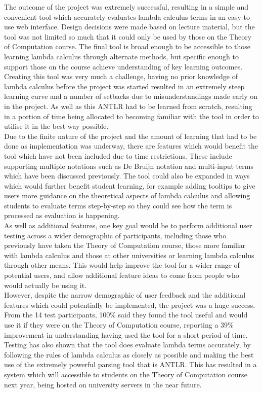 \documentclass[a4paper,11pt]{report}
\begin{document}
The outcome of the project was extremely successful, resulting in a simple and convenient tool which accurately evaluates lambda calculus terms in an easy-to-use web interface. Design decisions were made based on lecture material, but the tool was not limited so much that it could only be used by those on the Theory of Computation course. The final tool is broad enough to be accessible to those learning lambda calculus through alternate methods, but specific enough to support those on the course achieve understanding of key learning outcomes.\\

Creating this tool was very much a challenge, having no prior knowledge of lambda calculus before the project was started resulted in an extremely steep learning curve and a number of setbacks due to misunderstandings made early on in the project. As well as this ANTLR had to be learned from scratch, resulting in a portion of time being allocated to becoming familiar with the tool in order to utilise it in the best way possible.\\

Due to the finite nature of the project and the amount of learning that had to be done as implementation was underway, there are features which would benefit the tool which have not been included due to time restrictions. These include supporting multiple notations such as De Bruijn notation and multi-input terms which have been discussed previously. The tool could also be expanded in ways which would further benefit student learning, for example adding tooltips to give users more guidance on the theoretical aspects of lambda calculus and allowing students to evaluate terms step-by-step so they could see how the term is processed as evaluation is happening.\\

As well as additional features, one key goal would be to perform additional user testing across a wider demographic of participants, including those who previously have taken the Theory of Computation course, those more familiar with lambda calculus and those at other universities or learning lambda calculus through other means. This would help improve the tool for a wider range of potential users, and allow additional feature ideas to come from people who would actually be using it.\\

However, despite the narrow demographic of user feedback and the additional features which could potentially be implemented, the project was a huge success. From the 14 test participants, 100\% said they found the tool useful and would use it if they were on the Theory of Computation course, reporting a 39\% improvement in understanding having used the tool for a short period of time. Testing has also shown that the tool does evaluate lambda terms accurately, by following the rules of lambda calculus as closely as possible and making the best use of the extremely powerful parsing tool that is ANTLR. This has resulted in a system which will accessible to students on the Theory of Computation course next year, being hosted on university servers in the near future.\\
\end{document}
